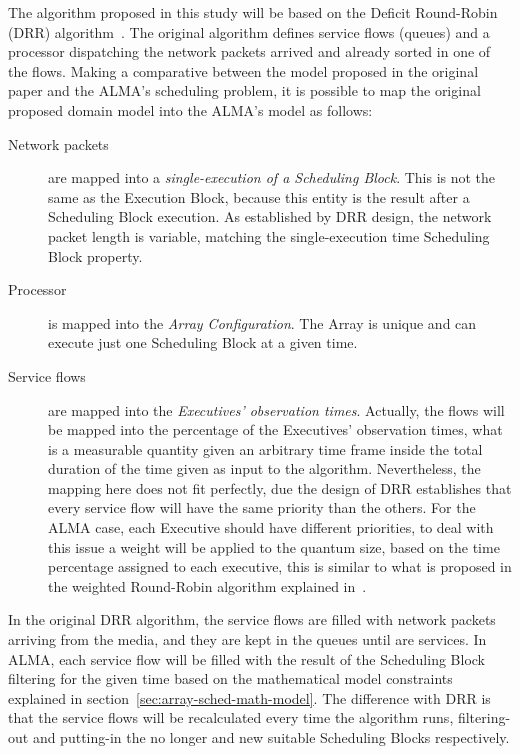 The algorithm proposed in this study will be based on the Deficit Round-Robin (DRR) algorithm~\cite{shreedhar96}. The original algorithm defines service flows (queues) and a processor dispatching the network packets arrived and already sorted in one of the flows. Making a comparative between the model proposed in the original paper and the ALMA's scheduling problem, it is possible to map the original proposed domain model into the ALMA's model as follows:

\begin{description}
\item[Network packets] are mapped into a \textit{single-execution of a Scheduling Block}. This is not the same as the Execution Block, because this entity is the result after a Scheduling Block execution. As established by DRR design, the network packet length is variable, matching the single-execution time Scheduling Block property.

\item[Processor] is mapped into the \textit{Array Configuration}. The Array is unique and can execute just one Scheduling Block at a given time.

\item[Service flows] are mapped into the \textit{Executives' observation times}. Actually, the flows will be mapped into the percentage of the Executives' observation times, what is a measurable quantity given an arbitrary time frame inside the total duration of the time given as input to the algorithm. Nevertheless, the mapping here does not fit perfectly, due the design of DRR establishes that every service flow will have the same priority than the others. For the ALMA case, each Executive should have different priorities, to deal with this issue a weight will be applied to the quantum size, based on the time percentage assigned to each executive, this is similar to what is proposed in the weighted Round-Robin algorithm explained in~\cite{katevenis91}.
\end{description}

In the original DRR algorithm, the service flows are filled with network packets arriving from the media, and they are kept in the queues until are services. In ALMA, each service flow will be filled with the result of the Scheduling Block filtering for the given time based on the mathematical model constraints explained in section~\ref{sec:array-sched-math-model}. The difference with DRR is that the service flows will be recalculated every time the algorithm runs, filtering-out and putting-in the no longer and new suitable Scheduling Blocks respectively.

